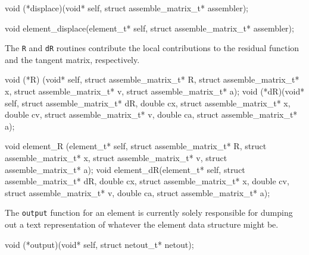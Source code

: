 \nwenddocs{}\plusendmoddef
void (*displace)(void* self, struct assemble_matrix_t* assembler);
\nwendcode{}\nwdocspar

\nwenddocs{}\plusendmoddef
void element_displace(element_t* self, struct assemble_matrix_t* assembler);
\nwendcode{}\nwdocspar


The {\tt{}R} and {\tt{}dR} routines contribute the local contributions
to the residual function and the tangent matrix, respectively.

\nwenddocs{}\plusendmoddef
void (*R) (void* self, struct assemble_matrix_t* R, 
           struct assemble_matrix_t* x,
           struct assemble_matrix_t* v,
           struct assemble_matrix_t* a);
void (*dR)(void* self, struct assemble_matrix_t* dR,
           double cx, struct assemble_matrix_t* x,
           double cv, struct assemble_matrix_t* v,
           double ca, struct assemble_matrix_t* a);
\nwendcode{}\nwdocspar

\nwenddocs{}\plusendmoddef
void element_R (element_t* self, struct assemble_matrix_t* R,
                struct assemble_matrix_t* x,
                struct assemble_matrix_t* v,
                struct assemble_matrix_t* a);
void element_dR(element_t* self, struct assemble_matrix_t* dR,
                double cx, struct assemble_matrix_t* x,
                double cv, struct assemble_matrix_t* v,
                double ca, struct assemble_matrix_t* a);
\nwendcode{}\nwdocspar


The {\tt{}output} function for an element is currently solely
responsible for dumping out a text representation of whatever
the element data structure might be.

\nwenddocs{}\plusendmoddef
void (*output)(void* self, struct netout_t* netout);
\nwendcode{}\nwdocspar

